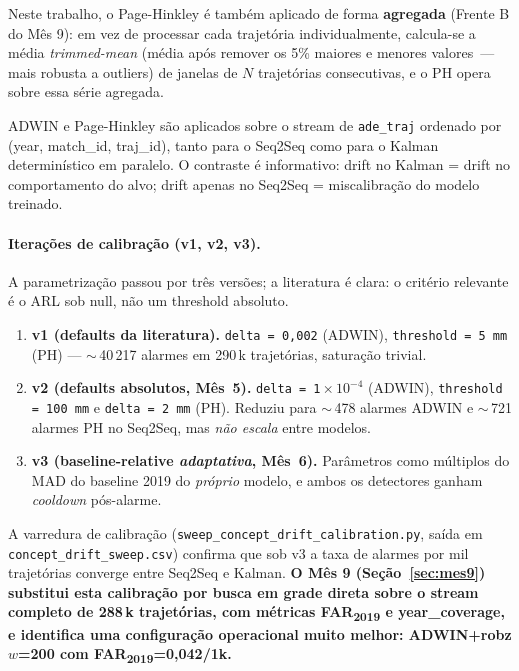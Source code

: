 \documentclass[11pt,a4paper]{article}
\newcommand{\sci}[1]{\ensuremath{\!\times\!10^{#1}}}
\begin{document}
Neste trabalho, o Page-Hinkley \'e tamb\'em aplicado de forma \textbf{agregada} (Frente B do M\^es 9): em vez de processar cada trajet\'oria individualmente, calcula-se a m\'edia \emph{trimmed-mean} (m\'edia ap\'os remover os 5\% maiores e menores valores~--- mais robusta a outliers) de janelas de $N$ trajet\'orias consecutivas, e o PH opera sobre essa s\'erie agregada.

ADWIN e Page-Hinkley s\~ao aplicados sobre o stream de \texttt{ade\_traj}
ordenado por (year, match\_id, traj\_id), tanto para o Seq2Seq como para
o Kalman determin\'istico em paralelo. O contraste \'e informativo:
drift no Kalman = drift no comportamento do alvo; drift apenas no
Seq2Seq = miscalibra\c{c}\~ao do modelo treinado.

\paragraph{Itera\c{c}\~oes de calibra\c{c}\~ao (v1, v2, v3).}
A parametriza\c{c}\~ao passou por tr\^es vers\~oes; a literatura
\cite{gama2014,lu2019,mouss2004} \'e clara: o crit\'erio relevante \'e
o ARL sob null, n\~ao um threshold absoluto.

\begin{enumerate}[leftmargin=1.4em,itemsep=2pt]
    \item \textbf{v1 (defaults da literatura).} \texttt{delta\,=\,0{,}002}
          (ADWIN), \texttt{threshold\,=\,5\,mm} (PH) ---
          $\sim$\,40\,217 alarmes em 290\,k trajet\'orias, satura\c{c}\~ao trivial.
    \item \textbf{v2 (defaults absolutos, M\^es~5).}
          \texttt{delta\,=\,1\sci{-4}} (ADWIN),
          \texttt{threshold\,=\,100\,mm} e \texttt{delta\,=\,2\,mm}
          (PH). Reduziu para $\sim$\,478 alarmes ADWIN e $\sim$\,721
          alarmes PH no Seq2Seq, mas \emph{n\~ao escala} entre modelos.
    \item \textbf{v3 (baseline-relative \emph{adaptativa}, M\^es~6).}
          Par\^ametros como m\'ultiplos do MAD do baseline 2019 do
          \emph{pr\'oprio} modelo, e ambos os detectores ganham
          \emph{cooldown} p\'os-alarme.
\end{enumerate}

A varredura de calibra\c{c}\~ao
(\texttt{sweep\_concept\_drift\_calibration.py}, sa\'ida em
\texttt{concept\_drift\_sweep.csv}) confirma que sob v3 a taxa de
alarmes por mil trajet\'orias converge entre Seq2Seq e Kalman.
\textbf{O M\^es 9 (Se\c{c}\~ao~\ref{sec:mes9}) substitui esta
calibra\c{c}\~ao por busca em grade direta sobre o stream completo de
288\,k trajet\'orias, com m\'etricas FAR\textsubscript{2019} e
year\_coverage, e identifica uma configura\c{c}\~ao operacional muito
melhor: ADWIN+robz $w$=200 com FAR\textsubscript{2019}=0{,}042/1k.}
\end{document}

